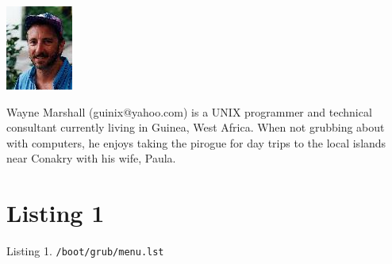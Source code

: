 \documentclass{article}
\begin{document}
\begin{minipage}{0.3\textwidth}
    \includegraphics{author-photo_Wayne.jpg}
\end{minipage}
\begin{minipage}{0.5\textwidth}
    Wayne Marshall (guinix@yahoo.com) is a UNIX programmer
    and technical consultant currently living in Guinea, West Africa.
    When not grubbing about with computers,
    he enjoys taking the pirogue for day trips to
    the local islands near Conakry with his wife, Paula.
\end{minipage}











\clearpage
\appendix

\section{Listing 1}
\label{list-1}

Listing 1. \texttt{/boot/grub/menu.lst}
\end{document}
